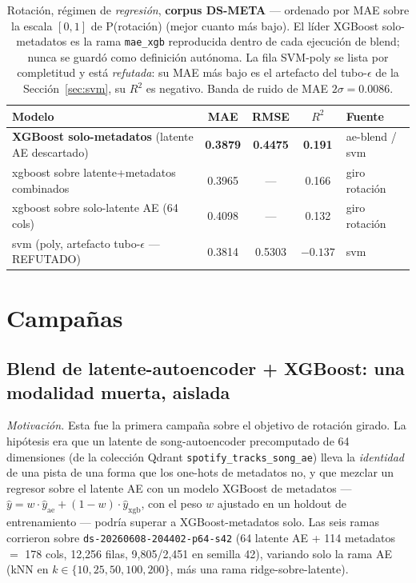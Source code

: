 \documentclass[11pt]{article}
\newcommand{\dsid}[1]{\texttt{\small #1}}
\newcommand{\best}[1]{\textbf{#1}}
\newcommand{\rsq}{$R^2$}
\begin{document}
\begin{table}[ht]
  \centering
  \caption{Rotación, régimen de \emph{regresión}, \textbf{corpus DS-META} ---
  ordenado por MAE sobre la escala $[0,1]$ de P(rotación) (mejor cuanto más
  bajo). El líder XGBoost solo-metadatos es la rama \texttt{mae\_xgb} reproducida
  dentro de cada ejecución de blend; nunca se guardó como definición autónoma. La
  fila SVM-poly se lista por completitud y está \emph{refutada}: su MAE más bajo
  es el artefacto del tubo-$\epsilon$ de la Sección~\ref{sec:svm}, su \rsq{} es
  negativo. Banda de ruido de MAE $2\sigma=0.0086$.}
  \label{tab:lb-mae}
  \begin{tabular}{lcccl}
    \toprule
    Modelo & MAE & RMSE & \rsq{} & Fuente \\
    \midrule
    \best{XGBoost solo-metadatos} (latente AE descartado) & \best{0.3879} & \best{0.4475} & \best{0.191} & ae-blend / svm \\
    xgboost sobre latente+metadatos combinados            & 0.3965 & --- & 0.166 & giro rotación \\
    xgboost sobre solo-latente AE (64 cols)               & 0.4098 & --- & 0.132 & giro rotación \\
    svm (poly, artefacto tubo-$\epsilon$ --- REFUTADO)    & 0.3814 & 0.5303 & $-0.137$ & svm \\
    \bottomrule
  \end{tabular}
\end{table}

\section{Campañas}

\subsection{Blend de latente-autoencoder + XGBoost: una modalidad muerta, aislada}
\label{sec:ae-blend}
\emph{Motivación.} Esta fue la primera campaña sobre el objetivo de rotación
girado. La hipótesis era que un latente de song-autoencoder precomputado de 64
dimensiones (de la colección Qdrant \texttt{spotify\_tracks\_song\_ae}) lleva la
\emph{identidad} de una pista de una forma que los one-hots de metadatos no, y
que mezclar un regresor sobre el latente AE con un modelo XGBoost de metadatos
--- $\hat{y}=w\cdot\hat{y}_{\text{ae}}+(1-w)\cdot\hat{y}_{\text{xgb}}$, con el
peso $w$ ajustado en un holdout de entrenamiento --- podría superar a
XGBoost-metadatos solo. Las seis ramas corrieron sobre
\dsid{ds-20260608-204402-p64-s42} (64 latente AE + 114 metadatos $=$ 178 cols,
12{,}256 filas, 9{,}805/2{,}451 en semilla 42), variando solo la rama AE (kNN en
$k\in\{10,25,50,100,200\}$, más una rama ridge-sobre-latente).
\end{document}
